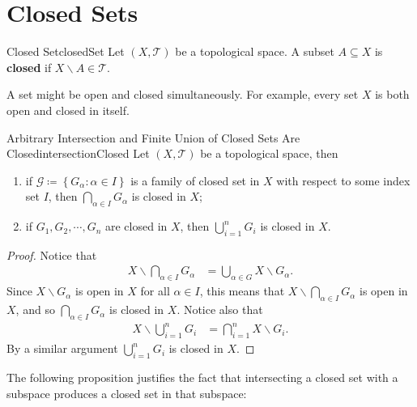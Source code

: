 \documentclass[math]{amznotes}
\theoremstyle{remark}
\begin{document}
\section{Closed Sets}
\begin{dfnbox}{Closed Set}{closedSet}
    Let $\left(X, \mathcal{T}\right)$ be a topological space. A subset $A \subseteq X$ is {\color{red} \textbf{closed}} if $X \backslash A \in \mathcal{T}$.
\end{dfnbox}
A set might be open and closed simultaneously. For example, every set $X$ is both open and closed in itself.
\begin{probox}{\small Arbitrary Intersection and Finite Union of Closed Sets Are Closed}{intersectionClosed}
    Let $\left(X, \mathcal{T}\right)$ be a topological space, then 
    \begin{enumerate}
        \item if $\mathcal{G} \coloneqq \left\{G_{\alpha} \colon \alpha \in I\right\}$ is a family of closed set in $X$ with respect to some index set $I$, then $\bigcap_{\alpha \in I}G_{\alpha}$ is closed in $X$;
        \item if $G_1, G_2, \cdots, G_n$ are closed in $X$, then $\bigcup_{i = 1}^nG_i$ is closed in $X$.
    \end{enumerate}
    \tcblower
    \begin{proof}
        Notice that
        \begin{align*}
            X \backslash \bigcap_{\alpha \in I}G_{\alpha} & = \bigcup_{\alpha \in G} X \backslash G_{\alpha}.
        \end{align*}
        Since $X \backslash G_{\alpha}$ is open in $X$ for all $\alpha \in I$, this means that $X \backslash \bigcap_{\alpha \in I}G_{\alpha}$ is open in $X$, and so $\bigcap_{\alpha \in I}G_{\alpha}$ is closed in $X$. Notice also that 
        \begin{align*}
            X \backslash \bigcup_{i = 1}^nG_i & = \bigcap_{i = 1}^nX \backslash G_i.
        \end{align*}
        By a similar argument $\bigcup_{i = 1}^nG_i$ is closed in $X$.
    \end{proof}
\end{probox}
The following proposition justifies the fact that intersecting a closed set with a subspace produces a closed set in that subspace:
\end{document}
